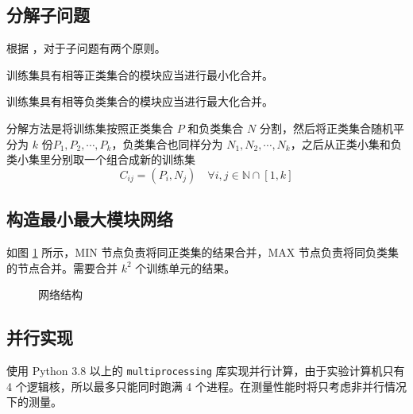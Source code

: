     \subsection{分解子问题}

    根据 \cite{minmax}，对于子问题有两个原则。
    \begin{lemma}[最小化原则]\label{lemma:min}
        训练集具有相等正类集合的模块应当进行最小化合并。
    \end{lemma}
    \begin{lemma}[最大化原则]\label{lemma:max}
        训练集具有相等负类集合的模块应当进行最大化合并。
    \end{lemma}

    分解方法是将训练集按照正类集合 $P$ 和负类集合 $N$ 分割，然后将正类集合随机平分为 $k$ 份$P_1,P_2,\cdots,P_k$，负类集合也同样分为 $N_1,N_2,\cdots,N_k$，之后从正类小集和负类小集里分别取一个组合成新的训练集
    \begin{equation*}
        C_{ij} = (P_i, N_j)\quad \forall i,j\in\mathbb{N}\cap[1,k]
    \end{equation*}

    \subsection{构造最小最大模块网络}


    如图 \ref{fig:minmax} 所示，MIN 节点负责将同正类集的结果合并，MAX 节点负责将同负类集的节点合并。需要合并 $k^2$ 个训练单元的结果。

    \begin{figure}[H]
        \centering
        
        \caption{网络结构}\label{fig:minmax}
    \end{figure}

    \subsection{并行实现}

    使用 Python 3.8 以上的 \verb"multiprocessing" 库实现并行计算，由于实验计算机只有 4 个逻辑核，所以最多只能同时跑满 4 个进程。在测量性能时将只考虑非并行情况下的测量。

